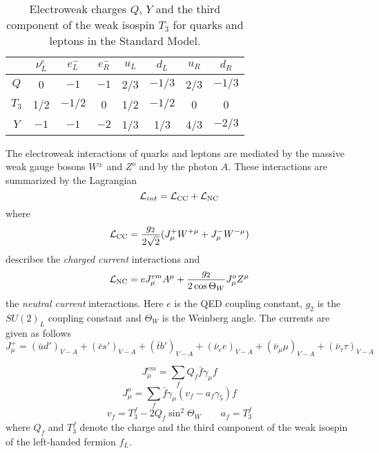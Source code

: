 \begin{table}[htb]
\caption[]{Electroweak charges $Q$, $Y$ and the third component of
the weak isospin $T_3$ for quarks and leptons in the Standard Model.
\label{tab:ewcharges}}
\begin{center}
\begin{tabular}{|c||c|c|c|c|c|c|c|}
 & $\nu^e_L$ & $ e^-_L$ & $ e^-_R$ & $u_L$ & $d_L$ & $u_R$ & $d_R$ \\
\hline
$Q$ & 0 & $-1$ & $-1$ & 2/3 & $-1/3$ & 2/3 & $-1/3$ \\
\hline
$T_3$ &1/2 & $-1/2$ & 0 & 1/2 & $-1/2$ & 0 & 0 \\
\hline
$Y$ & $-1$ & $-1$ & $-2$ & 1/3 & 1/3 & 4/3 & $-2/3$
\end{tabular}
\end{center}
\end{table}

The electroweak interactions of quarks and leptons are mediated by
the massive weak gauge bosons $W^\pm$ and $Z^o$ and by the photon $A$.
These interactions are summarized by the Lagrangian
\begin{equation}\label{3}
{\cal L}_{int}={\cal L}_{\rm CC}+{\cal L}_{\rm NC}
\end{equation}
where
\begin{equation}\label{4}
{\cal L}_{\rm CC}=\frac{g_2}{2 \sqrt{2}}(J^+_\mu W^{+\mu}+J^-_\mu W^{-\mu})
\end{equation}
describes the {\it charged current} interactions and
\begin{equation}\label{5}
{\cal L}_{\rm NC}=
 e J^{em}_\mu A^{\mu}+ \frac{g_2}{2 \cos \Theta_W} J^o_\mu Z^\mu
\end{equation}
the {\it neutral current} interactions. Here $e$ is the QED coupling constant,
$g_2$ is the $SU(2)_L$ coupling constant and $\Theta_W$ is the Weinberg
angle. The currents are given as follows
\begin{equation}\label{6}
J^+_\mu=
(\bar{u} d')_{V-A} +
(\bar{c} s')_{V-A} +
(\bar{t} b')_{V-A} +
(\bar{\nu}_e e)_{V-A} +
(\bar{\nu}_\mu \mu)_{V-A} +
(\bar{\nu}_\tau \tau)_{V-A}
\end{equation}

\begin{equation}\label{7}
J^{em}_\mu=\sum_f {Q_f \bar f \gamma_\mu f}
\end{equation}
\begin{equation}\label{8}
J^o_\mu=\sum_f \bar f \gamma_\mu (v_f-a_f\gamma_5) f
\end{equation}
\begin{equation}\label{9}
v_f=T^f_3-2 Q_f \sin^2\Theta_W
\qquad
a_f=T^f_3
\end{equation}
where $Q_f$ and $T^f_3$ denote the charge and the third component of the
weak isospin of the left-handed fermion $f_L$.


